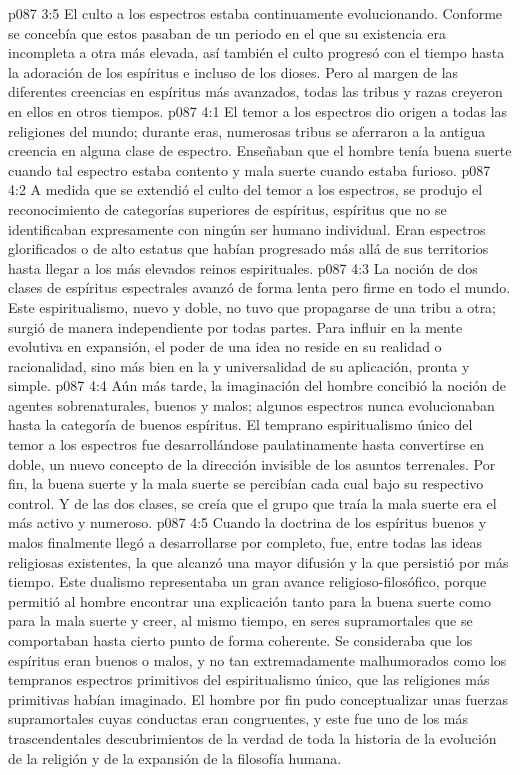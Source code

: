 \vs p087 3:5 \pc El culto a los espectros estaba continuamente evolucionando. Conforme se concebía que estos pasaban de un periodo en el que su existencia era incompleta a otra más elevada, así también el culto progresó con el tiempo hasta la adoración de los espíritus e incluso de los dioses. Pero al margen de las diferentes creencias en espíritus más avanzados, todas las tribus y razas creyeron en ellos en otros tiempos.
\vs p087 4:1 El temor a los espectros dio origen a todas las religiones del mundo; durante eras, numerosas tribus se aferraron a la antigua creencia en alguna clase de espectro. Enseñaban que el hombre tenía buena suerte cuando tal espectro estaba contento y mala suerte cuando estaba furioso.
\vs p087 4:2 A medida que se extendió el culto del temor a los espectros, se produjo el reconocimiento de categorías superiores de espíritus, espíritus que no se identificaban expresamente con ningún ser humano individual. Eran espectros glorificados o de alto estatus que habían progresado más allá de sus territorios hasta llegar a los más elevados reinos espirituales.
\vs p087 4:3 La noción de dos clases de espíritus espectrales avanzó de forma lenta pero firme en todo el mundo. Este espiritualismo, nuevo y doble, no tuvo que propagarse de una tribu a otra; surgió de manera independiente por todas partes. Para influir en la mente evolutiva en expansión, el poder de una idea no reside en su realidad o racionalidad, sino más bien en la  y universalidad de su aplicación, pronta y simple.
\vs p087 4:4 Aún más tarde, la imaginación del hombre concibió la noción de agentes sobrenaturales, buenos y malos; algunos espectros nunca evolucionaban hasta la categoría de buenos espíritus. El temprano espiritualismo único del temor a los espectros fue desarrollándose paulatinamente hasta convertirse en doble, un nuevo concepto de la dirección invisible de los asuntos terrenales. Por fin, la buena suerte y la mala suerte se percibían cada cual bajo su respectivo control. Y de las dos clases, se creía que el grupo que traía la mala suerte era el más activo y numeroso.
\vs p087 4:5 \pc Cuando la doctrina de los espíritus buenos y malos finalmente llegó a desarrollarse por completo, fue, entre todas las ideas religiosas existentes, la que alcanzó una mayor difusión y la que persistió por más tiempo. Este dualismo representaba un gran avance religioso\hyp{}filosófico, porque permitió al hombre encontrar una explicación tanto para la buena suerte como para la mala suerte y creer, al mismo tiempo, en seres supramortales que se comportaban hasta cierto punto de forma coherente. Se consideraba que los espíritus eran buenos o malos, y no tan extremadamente malhumorados como los tempranos espectros primitivos del espiritualismo único, que las religiones más primitivas habían imaginado. El hombre por fin pudo conceptualizar unas fuerzas supramortales cuyas conductas eran congruentes, y este fue uno de los más trascendentales descubrimientos de la verdad de toda la historia de la evolución de la religión y de la expansión de la filosofía humana.
